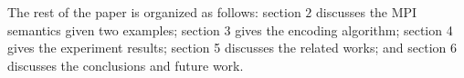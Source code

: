 The rest of the paper is organized as follows: section $2$ discusses the MPI semantics given two examples; section $3$ gives the encoding algorithm; section 4 gives the experiment results; section 5 discusses the related works; and section 6 discusses the conclusions and future work.

\examplefigone


           